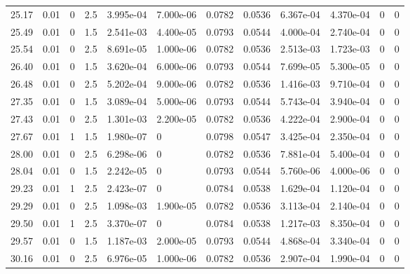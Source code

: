 \documentclass[preview]{standalone}
\begin{document}
{{{\begin{tabular}{L{1.2cm}C{1.2cm} C{0.3cm}C{0.5cm} C{1.4cm}C{1.4cm} C{1.4cm}C{1.4cm} C{1.6cm}C{1.6cm} C{1.6cm}C{1.6cm}}
  25.17  &  0.01  & 0     & 2.5 &  3.995e-04  & 7.000e-06  &  0.0782&   0.0536& 6.367e-04 & 4.370e-04   &  0 & 0  \\ 
  25.49  &  0.01  & 0     & 1.5 &  2.541e-03  & 4.400e-05  &  0.0793&   0.0544& 4.000e-04 & 2.740e-04   &  0 & 0  \\ 
  25.54  &  0.01  & 0     & 2.5 &  8.691e-05  & 1.000e-06  &  0.0782&   0.0536& 2.513e-03 & 1.723e-03   &  0 & 0  \\ 
  26.40  &  0.01  & 0     & 1.5 &  3.620e-04  & 6.000e-06  &  0.0793&   0.0544& 7.699e-05 & 5.300e-05   &  0 & 0  \\ 
  26.48  &  0.01  & 0     & 2.5 &  5.202e-04  & 9.000e-06  &  0.0782&   0.0536& 1.416e-03 & 9.710e-04   &  0 & 0  \\ 
  27.35  &  0.01  & 0     & 1.5 &  3.089e-04  & 5.000e-06  &  0.0793&   0.0544& 5.743e-04 & 3.940e-04   &  0 & 0  \\ 
  27.43  &  0.01  & 0     & 2.5 &  1.301e-03  & 2.200e-05  &  0.0782&   0.0536& 4.222e-04 & 2.900e-04   &  0 & 0  \\ 
  27.67  &  0.01  & 1     & 1.5 &  1.980e-07  & 0  &  0.0798&   0.0547& 3.425e-04 & 2.350e-04   &  0 & 0  \\ 
  28.00  &  0.01  & 0     & 2.5 &  6.298e-06  & 0  &  0.0782&   0.0536& 7.881e-04 & 5.400e-04   &  0 & 0  \\ 
  28.04  &  0.01  & 0     & 1.5 &  2.242e-05  & 0  &  0.0793&   0.0544& 5.760e-06 & 4.000e-06   &  0 & 0  \\ 
  29.23  &  0.01  & 1     & 2.5 &  2.423e-07  & 0  &  0.0784&   0.0538& 1.629e-04 & 1.120e-04   &  0 & 0  \\ 
  29.29  &  0.01  & 0     & 2.5 &  1.098e-03  & 1.900e-05  &  0.0782&   0.0536& 3.113e-04 & 2.140e-04   &  0 & 0  \\ 
  29.50  &  0.01  & 1     & 2.5 &  3.370e-07  & 0  &  0.0784&   0.0538& 1.217e-03 & 8.350e-04   &  0 & 0  \\ 
  29.57  &  0.01  & 0     & 1.5 &  1.187e-03  & 2.000e-05  &  0.0793&   0.0544& 4.868e-04 & 3.340e-04   &  0 & 0  \\ 
  30.16  &  0.01  & 0     & 2.5 &  6.976e-05  & 1.000e-06  &  0.0782&   0.0536& 2.907e-04 & 1.990e-04   &  0 & 0  \\ 
\hline 
\end{tabular} 

}}}
\end{document}
